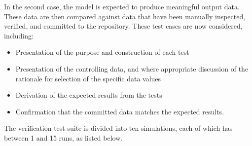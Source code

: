 \documentclass[11pt,fleqn]{report}
\begin{document}
In the second case, the model is expected to produce meaningful output data.
These data are then compared against data that have been manually inspected,
verified, and committed to the repository.  These test cases are now
considered, including:
\begin{itemize}
 \item Presentation of the purpose and construction of each test
 \item Presentation of the controlling data, and where appropriate
 discussion of the rationale for selection of the specific data values
 \item Derivation of the expected results from the tests
 \item Confirmation that the committed data matches the expected results.
\end{itemize}

The verification test suite is divided into ten simulations, each of which
has between 1 and 15 runs, as listed below.
\end{document}

